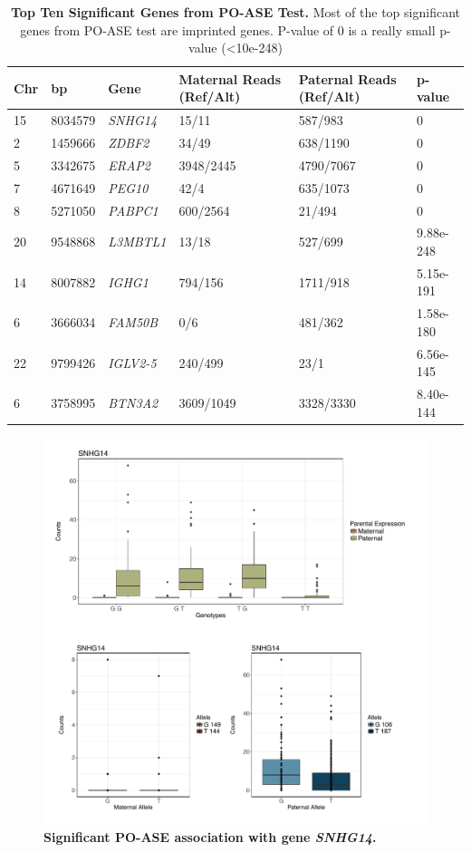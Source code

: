 \begin{table}[!htb]
\centering
\begin{adjustbox}{width={\textwidth}}
\begin{tabular}{@{}p{1cm}p{3cm}p{3cm}p{5cm}p{5cm}p{3cm}@{}}
 \toprule  Chr & bp & Gene & Maternal Reads (Ref/Alt) & Paternal Reads (Ref/Alt) & p-value \\ \midrule
15 & 8034579 & \emph{SNHG14} & 15/11  & 587/983 & 0 \\
2 & 1459666  & \emph{ZDBF2} & 34/49  & 638/1190 & 0\\
5 & 3342675 & \emph{ERAP2} & 3948/2445 & 4790/7067 & 0\\
7 & 4671649 &  \emph{PEG10} & 42/4  & 635/1073 & 0 \\
8 & 5271050 & \emph{PABPC1} & 600/2564 & 21/494 & 0 \\
20 & 9548868 & \emph{L3MBTL1} & 13/18 & 527/699 & 9.88e-248 \\
14 & 8007882 & \emph{IGHG1} &   794/156  & 1711/918 & 5.15e-191\\
6 & 3666034 & \emph{FAM50B} & 0/6 & 481/362 & 1.58e-180\\
22 & 9799426 & \emph{IGLV2-5} & 240/499 & 23/1 & 6.56e-145\\
6 & 3758995 & \emph{BTN3A2} & 3609/1049  & 3328/3330 &  8.40e-144\\  \bottomrule
\end{tabular}
\end{adjustbox}
\caption[Top Ten Significant Genes from PO-ASE Test.]{\textbf{Top Ten Significant Genes from PO-ASE Test.} Most of the top significant genes from PO-ASE test are imprinted genes. P-value of 0 is a really small p-value (\textless 10e-248)}
\label{tab:poase1}
\end{table}


\begin{figure}[!htb]
\centering \includegraphics[width=5in]{img/ch04/fig-08-SNHG14.pdf}
\caption[Significant PO-ASE association with gene \emph{SNHG14}.]{\textbf{Significant PO-ASE association with gene \emph{SNHG14}.} }
\label{fig:SNHG14}
\end{figure}

